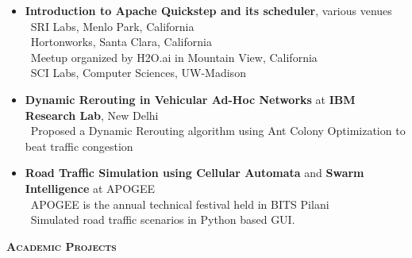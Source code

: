 \documentclass[11pt]{article}
\newcommand{\graybox}[1]{\begin{mdframed}[backgroundcolor=light-gray, linecolor=light-gray, roundcorner=10pt, shadow=false, shadowsize=1pt]
\Large{\textbf{\textsc{#1}}}
\end{mdframed}}
\begin{document}
\begin{itemize}\addtolength{\itemsep}{-0.5\baselineskip}
	\item{\textbf{Introduction to Apache Quickstep and its scheduler}, various venues}\\
	\textendash\  SRI Labs, Menlo Park, California\\
	\textendash\  Hortonworks, Santa Clara, California\\
	\textendash\  Meetup organized by H2O.ai in Mountain View, California\\	
	\textendash\  SCI Labs, Computer Sciences, UW-Madison\\		
	\item{\textbf{Dynamic Rerouting in Vehicular Ad-Hoc Networks} at \textbf{IBM Research Lab}, New Delhi}\\
	\textendash\ Proposed a Dynamic Rerouting algorithm using Ant Colony Optimization to beat traffic congestion\\
	\item{\textbf{Road Traffic Simulation using Cellular Automata} and \textbf{Swarm Intelligence} at APOGEE}\\
	\textendash\  APOGEE is the annual technical festival held in BITS Pilani\\
	\textendash\  Simulated road traffic scenarios in Python based GUI.
\end{itemize}
\graybox{Academic Projects}
\end{document}
